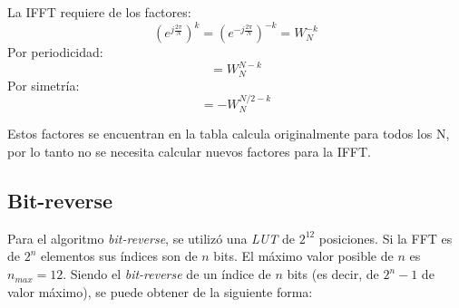 \documentclass[../ASSD_TP2.tex]{subfiles}
\begin{document}
La IFFT requiere de los factores:
\[ \left( e^{j\frac{2\pi}{N}} \right)^k = \left( e^{-j\frac{2\pi}{N}} \right)^{-k} = W_N^{-k}\]Por periodicidad: \[ = W_N^{N-k}\] Por simetr\'ia: \[=-W_N^{N/2-k}\]

Estos factores se encuentran en la tabla calcula originalmente para todos los N, por lo tanto no se necesita calcular nuevos factores para la IFFT.

\subsection*{Bit-reverse}
Para el algoritmo \textit{bit-reverse}, se utiliz\'o una \textit{LUT} de $2^{12}$ posiciones. Si la FFT es de $2^n$ elementos sus \'indices son de $n$ bits. El m\'aximo valor posible de $ n $ es $n_{max} = 12$. Siendo  el \textit{bit-reverse} de un \'indice  de $n$ bits (es decir, de $2^n-1$ de valor m\'aximo), se puede obtener de la siguiente forma:
\begin{center}
\end{center}
\end{document}
